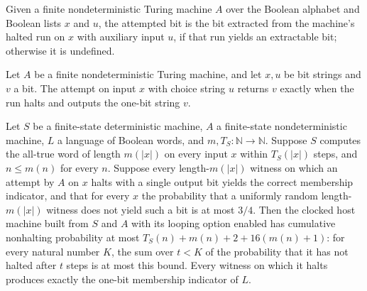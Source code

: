 \begin{definition}
\label{Randomized.attemptBit}
\leanok
{}
Given a finite nondeterministic Turing machine $A$ over the Boolean alphabet and Boolean
lists $x$ and $u$, the attempted bit is the bit extracted from the machine's halted run
on $x$ with auxiliary input $u$, if that run yields an extractable bit; otherwise it is
undefined.
\end{definition}

\begin{theorem}
\label{Randomized.attemptBit_eq_some}
\leanok
{}
Let $A$ be a finite nondeterministic Turing machine, and let $x,u$ be bit strings and
$v$ a bit. The attempt on input $x$ with choice string $u$ returns $v$ exactly when the
run halts and outputs the one-bit string $v$.
\end{theorem}

\begin{theorem}
\label{Randomized.clockHost_zDecides}
\leanok
{}
Let $S$ be a finite-state deterministic machine, $A$ a finite-state nondeterministic
machine, $L$ a language of Boolean words, and $m,T_S:\mathbb{N}\to\mathbb{N}$. Suppose
$S$ computes the all-true word of length $m(|x|)$ on every input $x$ within $T_S(|x|)$
steps, and $n\le m(n)$ for every $n$. Suppose every length-$m(|x|)$ witness on which an
attempt by $A$ on $x$ halts with a single output bit yields the correct membership
indicator, and that for every $x$ the probability that a uniformly random
length-$m(|x|)$ witness does not yield such a bit is at most $3/4$. Then the clocked
host machine built from $S$ and $A$ with its looping option enabled has cumulative
nonhalting probability at most $T_S(n)+m(n)+2+16(m(n)+1)$: for every natural number $K$,
the sum over $t<K$ of the probability that it has not halted after $t$ steps is at most
this bound. Every witness on which it halts produces exactly the one-bit membership
indicator of $L$.
\end{theorem}

